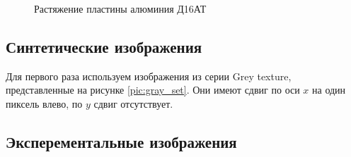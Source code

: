 \begin{figure}[ht]
\caption{Растяжение пластины алюминия Д16АТ}
\label{pic:real_deform}
\end{figure}

\subsection{Синтетические изображения}

Для первого раза используем изображения из серии Grey texture, представленные на рисунке \ref{pic:gray_set}. Они имеют сдвиг по оси $x$ на один пиксель влево, по $y$ сдвиг отсутствует.


\subsection{Эксперементальные изображения}